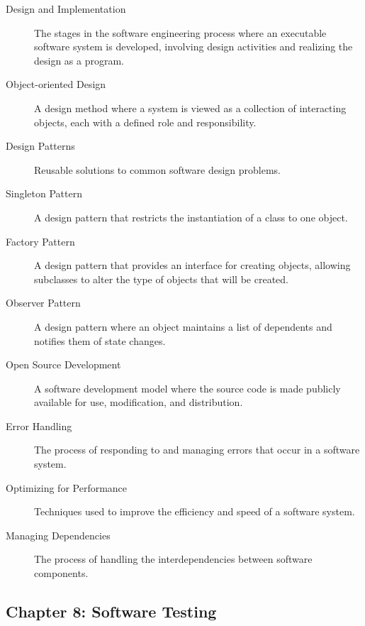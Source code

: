 \documentclass{article}
\begin{document}
\begin{description}
  \item[Design and Implementation] The stages in the software engineering process where an executable software system is developed, involving design activities and realizing the design as a program.
  \item[Object-oriented Design] A design method where a system is viewed as a collection of interacting objects, each with a defined role and responsibility.
  \item[Design Patterns] Reusable solutions to common software design problems.
  \item[Singleton Pattern] A design pattern that restricts the instantiation of a class to one object.
  \item[Factory Pattern] A design pattern that provides an interface for creating objects, allowing subclasses to alter the type of objects that will be created.
  \item[Observer Pattern] A design pattern where an object maintains a list of dependents and notifies them of state changes.
  \item[Open Source Development] A software development model where the source code is made publicly available for use, modification, and distribution.
  \item[Error Handling] The process of responding to and managing errors that occur in a software system.
  \item[Optimizing for Performance] Techniques used to improve the efficiency and speed of a software system.
  \item[Managing Dependencies] The process of handling the interdependencies between software components.
\end{description}
\subsection{Chapter 8: Software Testing}
\end{document}
